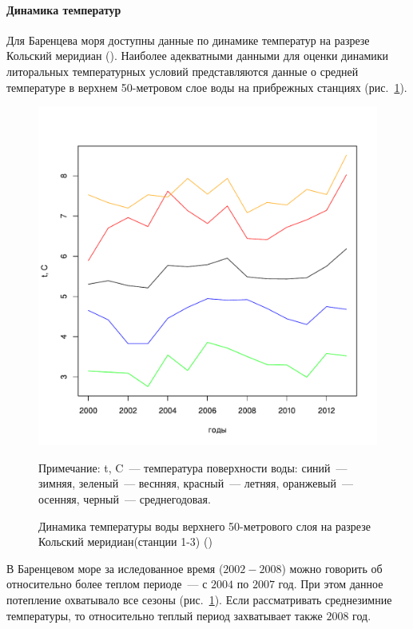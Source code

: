 		\paragraph{Динамика температур}
Для Баренцева моря доступны данные по динамике температур на разрезе Кольский меридиан (\cite{pinro}). 
Наиболее адекватными данными для оценки динамики литоральных температурных условий представляются данные о средней температуре в верхнем 50-метровом слое воды на прибрежных станциях (рис.~\ref{ris:Barents_temp_dynamic}).
	\begin{figure}[p]
    \includegraphics[width=\textwidth]{../Barenc_Sea/temperature/t_air_mean_season_year1.pdf}
    \caption{Динамика температуры воды верхнего 50-метрового слоя на разрезе Кольский меридиан(станции 1-3) (\cite{pinro})}

{\footnotesize Примечание: t, C~--- температура поверхности воды: синий~--- зимняя, зеленый~--- веснняя, красный~--- летняя, оранжевый~--- осенняя, черный~--- среднегодовая. }
    \label{ris:Barents_temp_dynamic}
	\end{figure}

В Баренцевом море за иследованное время ($2002 - 2008$) можно говорить об относительно более теплом периоде~--- с $2004$ по $2007$ год.
При этом данное потепление охватывало все сезоны (рис.~\ref{ris:Barents_temp_dynamic}).
Если рассматривать среднезимние температуры, то относительно теплый период захватывает также $2008$ год.


